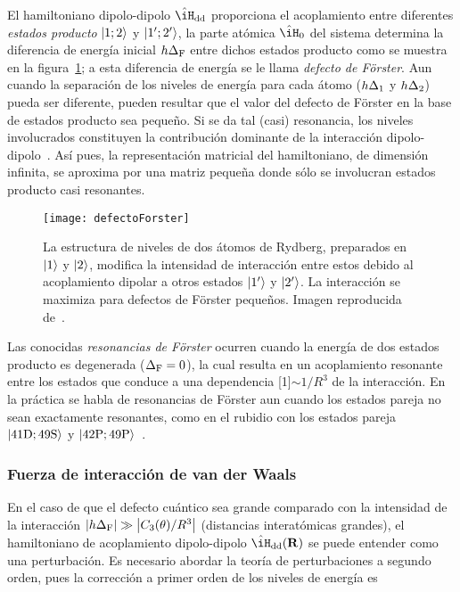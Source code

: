 \p El hamiltoniano dipolo-dipolo $\hat{\iH}_\sm{\text{dd}}$ proporciona el acoplamiento entre diferentes \emph{estados producto} $\ket{1;2}$ y $\ket{1';2'}$, la parte atómica $\hat{\iH}_\sm{0}$ del sistema determina la diferencia de energía inicial $h\Delta_{\text{F}}$ entre dichos estados producto como se muestra en la figura~\ref{fig:defectoForster}; a esta diferencia de energía se le llama \emph{defecto de Förster}. Aun cuando la separación de los niveles de energía para cada átomo ($h\Delta_{1}$ y $h\Delta_{2}$) pueda ser diferente, pueden resultar que el valor del defecto de Förster en la base de estados producto sea pequeño. Si se da tal (casi) resonancia, los niveles involucrados constituyen la contribución dominante de la interacción dipolo-dipolo~\cite{paris}. Así pues, la representación matricial del hamiltoniano, de dimensión infinita, se aproxima por una matriz pequeña donde sólo se involucran estados producto casi resonantes.

\begin{figure}
\centering
\begin{minipage}{0.8\textwidth}
\centering
\texttt{[image: defectoForster]}
\caption[Defecto Föster]{\label{fig:defectoForster}La estructura de niveles de dos átomos de Rydberg, preparados en $\ket{1}$ y $\ket{2}$, modifica la intensidad de interacción entre estos debido al acoplamiento dipolar a otros estados $\ket{1'}$ y $\ket{2'}$. La interacción se maximiza para defectos de Förster pequeños. Imagen reproducida de~\cite{paris}.}
\end{minipage}
\end{figure}

Las conocidas \emph{resonancias de Förster} ocurren cuando la energía de dos estados producto es degenerada ($\Delta_{\text{F}}=0$), la cual resulta en un acoplamiento resonante entre los estados que conduce a una dependencia \scalebox{0.9}[1]{$\sim$}$1/R^{3}$ de la interacción. En la práctica se habla de resonancias de Förster aun cuando los estados pareja no sean exactamente resonantes, como en el rubidio con los estados pareja $\ket*{41\mathrm{D};49\mathrm{S}}$ y $\ket*{42\mathrm{P};49\mathrm{P}}$~\cite{comparat}.

\subsubsection{\label{ssub:vanderWaals}Fuerza de interacción de van der Waals}

En el caso de que el defecto cuántico sea grande comparado con la intensidad de la interacción $\left|h\Delta_{\text{F}}\right|\gg\left|C_{3}(\theta)/R^{3}\right|$ (distancias interatómicas grandes), el hamiltoniano de acoplamiento dipolo-dipolo $\hat{\iH}_\sm{\text{dd}}(\vektor{R})$ se puede entender como una perturbación. Es necesario abordar la teoría de perturbaciones a segundo orden, pues la corrección a primer orden de los niveles de energía es

